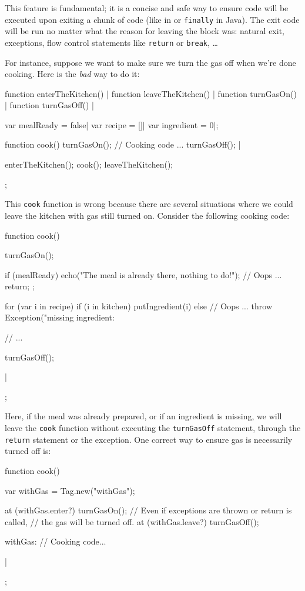 This feature is fundamental; it is a concise and safe way to ensure code
will be executed upon exiting a chunk of code (like  in \Cxx or
\lstinline|finally| in Java). The exit code will be run no matter what the
reason for leaving the block was: natural exit, exceptions, flow control
statements like \lstinline|return| or \lstinline|break|, \ldots

For instance, suppose we want to make sure we turn the gas off when
we're done cooking. Here is the \emph{bad} way to do it:

\begin{urbicomment}
function enterTheKitchen() {}|
function leaveTheKitchen() {}|
function turnGasOn() {}|
function turnGasOff() {}|

var mealReady = false|
var recipe = []|
var ingredient = 0|;
\end{urbicomment}
\begin{urbiscript}
{
  function cook()
  {
    turnGasOn();
    // Cooking code ...
    turnGasOff();
  }|

  enterTheKitchen();
  cook();
  leaveTheKitchen();
};
\end{urbiscript}

This \lstinline|cook| function is wrong because there are several situations
where we could leave the kitchen with gas still turned on. Consider the
following cooking code:

\begin{urbiscript}
{
  function cook()
  {
    turnGasOn();

    if (mealReady)
    {
      echo("The meal is already there, nothing to do!");
      // Oops ...
      return;
    };

    for (var i in recipe)
      if (i in kitchen)
        putIngredient(i)
      else
        // Oops ...
        throw Exception("missing ingredient: %

    // ...

    turnGasOff();
  }|
};
\end{urbiscript}

Here, if the meal was already prepared, or if an ingredient is missing, we
will leave the \lstinline|cook| function without executing the
\lstinline|turnGasOff| statement, through the \lstinline|return| statement
or the exception.  One correct way to ensure gas is necessarily turned off
is:

\begin{urbiscript}
{
  function cook()
  {
    var withGas = Tag.new("withGas");

    at (withGas.enter?)
      turnGasOn();
    // Even if exceptions are thrown or return is called,
    // the gas will be turned off.
    at (withGas.leave?)
      turnGasOff();

    withGas: {
      // Cooking code...
    }
  }|
};
\end{urbiscript}


